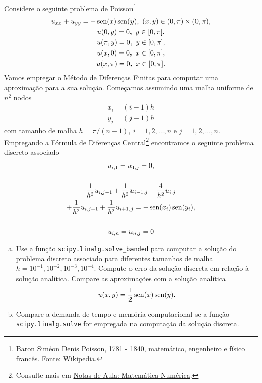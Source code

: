 \begin{exer}
  Considere o seguinte problema de Poisson\footnote{Baron Siméon Denis Poisson, 1781 - 1840, matemático, engenheiro e físico francês. Fonte: \href{https://en.wikipedia.org/wiki/Sim\%C3\%A9on_Denis_Poisson}{Wikipedia}.}
  \begin{gather}
    u_{xx} + u_{yy} = -\operatorname{sen}(x)\operatorname{sen}(y),~(x, y)\in (0, \pi)\times (0, \pi),\\
    u(0, y) = 0,~y\in [0, \pi],\\
    u(\pi, y) = 0,~y\in [0, \pi],\\
    u(x, 0) = 0,~x\in [0, \pi],\\
    u(x, \pi) = 0,~x\in [0, \pi].
  \end{gather}
  Vamos empregar o Método de Diferenças Finitas para computar uma aproximação para a sua solução. Começamos assumindo uma malha uniforme de $n^2$ nodos
  \begin{gather}
    x_i = (i-1)h\\
    y_j = (j-1)h
  \end{gather}
  com tamanho de malha $h = \pi/(n-1)$, $i=1,2,\dotsc,n$ e $j=1,2,\dotsc,n$. Empregando a Fórmula de Diferenças Central\footnote{Consulte mais em \href{https://phkonzen.github.io/notas/MatematicaNumerica/cap_edp_sec_Poisson.html}{Notas de Aula: Matemática Numérica}.} encontramos o seguinte problema discreto associado
  \begin{gather}
    u_{i, 1} = u_{1, j} = 0,\\
    ~\nonumber\\
    \frac{1}{h^2}u_{i,j-1} + \frac{1}{h^2}u_{i-1,j} - \frac{4}{h^2}u_{i,j} \nonumber\\
    + \frac{1}{h^2}u_{i,j+1} + \frac{1}{h^2}u_{i+1,j} = -\operatorname{sen}(x_i)\operatorname{sen}(y_i),\\
    ~\nonumber\\
    u_{i,n} = u_{n,j} = 0
  \end{gather}
  \begin{enumerate}[a)]
  \item Use a função \href{https://docs.scipy.org/doc/scipy/reference/generated/scipy.linalg.solve_banded.html}{\lstinline+scipy.linalg.solve_banded+} para computar a solução do problema discreto associado para diferentes tamanhos de malha $h = 10^{-1}, 10^{-2}, 10^{-3}, 10^{-4}$. Compute o erro da solução discreta em relação à solução analítica. Compare as aproximações com a solução analítica
    \begin{equation}
      u(x,y) = \frac{1}{2}\operatorname{sen}(x)\operatorname{sen}(y).
    \end{equation}
  \item Compare a demanda de tempo e memória computacional se a função \href{https://docs.scipy.org/doc/scipy/reference/generated/scipy.linalg.solve.html}{\lstinline+scipy.linalg.solve+} for empregada na computação da solução discreta.
  \end{enumerate}
\end{exer}


